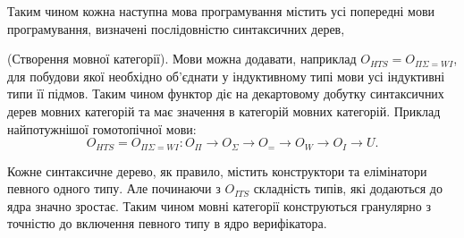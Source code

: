 Таким чином кожна наступна мова програмування містить усі попередні
мови програмування, визначені послідовністю синтаксичних дерев,

\begin{definition} (Створення мовної категорії).
Мови можна додавати, наприклад $O_{HTS} = O_{\Pi\Sigma=WI}$, для побудови якої необхідно
об'єднати у індуктивному типі мови усі індуктивні типи її підмов.
Таким чином функтор діє на декартовому добутку синтаксичних дерев мовних категорій
та має значення в категорій мовних категорій. Приклад найпотужнішої гомотопічної мови:
\begin{equation}
O_{HTS} = O_{\Pi\Sigma=WI} : O_\Pi \rightarrow O_\Sigma \rightarrow O_= \rightarrow O_W \rightarrow O_I \rightarrow U.
\end{equation}
\end{definition}

Кожне синтаксичне дерево, як правило, містить конструктори
та елімінатори певного одного типу. Але починаючи з $O_{ITS}$
складність типів, які додаються до ядра значно зростає.
Таким чином мовні категорії конструються гранулярно з
точністю до включення певного типу в ядро верифікатора.

